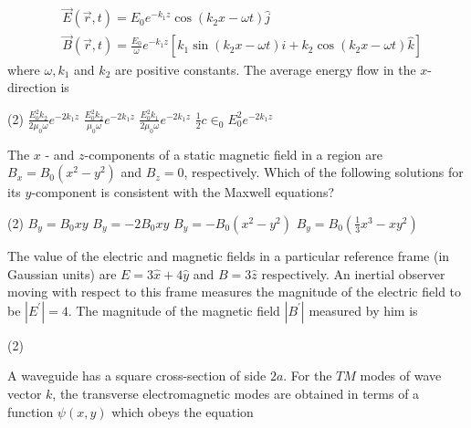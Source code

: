 \begin{enumerate}
\begin{minipage}{\textwidth}
	$$
	\begin{aligned}
	&\vec{E}(\vec{r}, t)=E_{0} e^{-k_{1} z} \cos \left(k_{2} x-\omega t\right) \hat{j} \\
	&\vec{B}(\vec{r}, t)=\frac{E_{0}}{\omega} e^{-k_{1} z}\left[k_{1} \sin \left(k_{2} x-\omega t\right) \hat{i}+k_{2} \cos \left(k_{2} x-\omega t\right) \hat{k}\right]
	\end{aligned}
	$$
	where $\omega, k_{1}$ and $k_{2}$ are positive constants. The average energy flow in the $x$-direction is
\end{minipage}
\begin{tasks}(2)
	\task[\textbf{A.}] $\frac{E_{0}^{2} k_{2}}{2 \mu_{0} \omega} e^{-2 k_{1} z}$
	\task[\textbf{B.}]$\frac{E_{0}^{2} k_{2}}{\mu_{0} \omega} e^{-2 k_{1} z}$
	\task[\textbf{C.}]$\frac{E_{0}^{2} k_{1}}{2 \mu_{0} \omega} e^{-2 k_{1} z}$
	\task[\textbf{D.}]$\frac{1}{2} c \in_{0} E_{0}^{2} e^{-2 k_{1} z}$
\end{tasks}
\begin{minipage}{\textwidth}
	\item The $x$ - and $z$-components of a static magnetic field in a region are $B_{x}=B_{0}\left(x^{2}-y^{2}\right)$ and $B_{z}=0$, respectively. Which of the following solutions for its $y$-component is consistent with the Maxwell equations?
\end{minipage}
\begin{tasks}(2)
	\task[\textbf{A.}] $B_{y}=B_{0} x y$
	\task[\textbf{B.}]$B_{y}=-2 B_{0} x y$
	\task[\textbf{C.}]$B_{y}=-B_{0}\left(x^{2}-y^{2}\right)$
	\task[\textbf{D.}] $B_{y}=B_{0}\left(\frac{1}{3} x^{3}-x y^{2}\right)$
\end{tasks}
\begin{minipage}{\textwidth}
	\item The value of the electric and magnetic fields in a particular reference frame (in Gaussian units) are $E=3 \hat{x}+4 \hat{y}$ and $B=3 \hat{z}$ respectively. An inertial observer moving with respect to this frame measures the magnitude of the electric field to be $\left|E^{\prime}\right|=4$. The magnitude of the magnetic field $\left|B^{\prime}\right|$ measured by him is
\end{minipage}
\begin{tasks}(2)
\end{tasks}
\begin{minipage}{\textwidth}
	\item A waveguide has a square cross-section of side $2 a$. For the $T M$ modes of wave vector $k$, the transverse electromagnetic modes are obtained in terms of a function $\psi(x, y)$ which obeys the equation

\end{minipage}
\end{enumerate}
